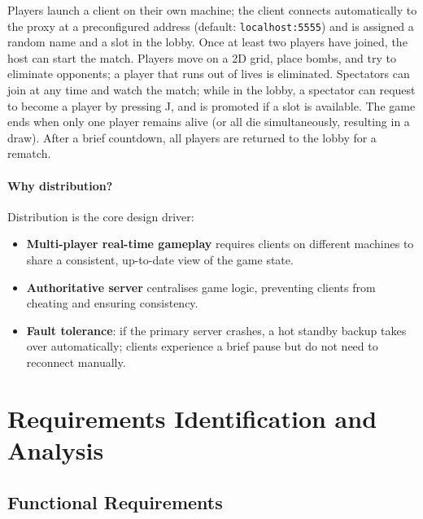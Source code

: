 \documentclass{scrartcl}
\begin{document}
Players launch a client on their own machine; the client connects automatically to the proxy at a preconfigured address (default: \texttt{localhost:5555}) and is assigned a random name and a slot in the lobby.
Once at least two players have joined, the host can start the match.
Players move on a 2D grid, place bombs, and try to eliminate opponents; a player that runs out of lives is eliminated.
Spectators can join at any time and watch the match; while in the lobby, a spectator can request to become a player by pressing J, and is promoted if a slot is available.
The game ends when only one player remains alive (or all die simultaneously, resulting in a draw).
After a brief countdown, all players are returned to the lobby for a rematch.

\paragraph{Why distribution?}
Distribution is the core design driver:
\begin{itemize}
    \item \textbf{Multi-player real-time gameplay} requires clients on different machines to share a consistent, up-to-date view of the game state.
    \item \textbf{Authoritative server} centralises game logic, preventing clients from cheating and ensuring consistency.
    \item \textbf{Fault tolerance}: if the primary server crashes, a hot standby backup takes over automatically; clients experience a brief pause but do not need to reconnect manually.
\end{itemize}

\newpage
\section{Requirements Identification and Analysis}\label{requirements}

\subsection{Functional Requirements}
\end{document}
